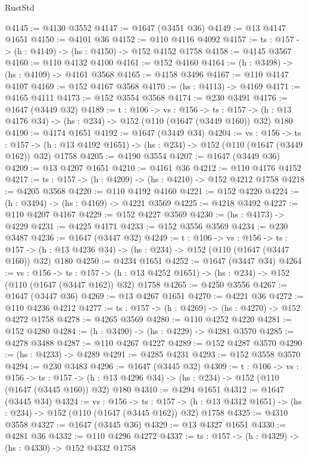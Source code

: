 \begin{lexlean}{RustStd}
\begin{coremodule}
@4145 := @4130 @3552
@4147 := @1647 (@3451 @36)
@4149 := @13 @4147 @1651
@4150 := @4101 @36
@4152 := @110 @4116 @4092
@4157 := {ts : @157} -> (h : @4149) -> (hs : @4150) -> @152 @4152 @1758
@4158 := @4145 @3567
@4160 := @110 @4132 @4100
@4161 := @152 @4160
@4164 := (h : @3498) -> (hs : @4109) -> @4161 @3568
@4165 := @4158 @3496
@4167 := @110 @4147 @4107
@4169 := @152 @4167 @3568
@4170 := (hs : @4113) -> @4169
@4171 := @4165 @4111
@4173 := @152 @3554 @3568
@4174 := @230 @3491
@4176 := @1647 (@3449 @32)
@4189 := {t : @106} ->
  {vs : @156} ->
  {ts : @157} -> (h : @13 @4176 @34) -> (hs : @234) -> @152 (@110 (@1647 (@3449 @160)) @32) @180
@4190 := @4174 @1651
@4192 := @1647 (@3449 @34)
@4204 := {vs : @156} ->
  {ts : @157} -> (h : @13 @4192 @1651) -> (hs : @234) -> @152 (@110 (@1647 (@3449 @162)) @32) @1758
@4205 := @4190 @3554
@4207 := @1647 (@3449 @36)
@4209 := @13 @4207 @1651
@4210 := @4161 @36
@4212 := @110 @4176 @4152
@4217 := {ts : @157} -> (h : @4209) -> (hs : @4210) -> @152 @4212 @1758
@4218 := @4205 @3568
@4220 := @110 @4192 @4160
@4221 := @152 @4220
@4224 := (h : @3494) -> (hs : @4169) -> @4221 @3569
@4225 := @4218 @3492
@4227 := @110 @4207 @4167
@4229 := @152 @4227 @3569
@4230 := (hs : @4173) -> @4229
@4231 := @4225 @4171
@4233 := @152 @3556 @3569
@4234 := @230 @3487
@4236 := @1647 (@3447 @32)
@4249 := {t : @106} ->
  {vs : @156} ->
  {ts : @157} -> (h : @13 @4236 @34) -> (hs : @234) -> @152 (@110 (@1647 (@3447 @160)) @32) @180
@4250 := @4234 @1651
@4252 := @1647 (@3447 @34)
@4264 := {vs : @156} ->
  {ts : @157} -> (h : @13 @4252 @1651) -> (hs : @234) -> @152 (@110 (@1647 (@3447 @162)) @32) @1758
@4265 := @4250 @3556
@4267 := @1647 (@3447 @36)
@4269 := @13 @4267 @1651
@4270 := @4221 @36
@4272 := @110 @4236 @4212
@4277 := {ts : @157} -> (h : @4269) -> (hs : @4270) -> @152 @4272 @1758
@4278 := @4265 @3569
@4280 := @110 @4252 @4220
@4281 := @152 @4280
@4284 := (h : @3490) -> (hs : @4229) -> @4281 @3570
@4285 := @4278 @3488
@4287 := @110 @4267 @4227
@4289 := @152 @4287 @3570
@4290 := (hs : @4233) -> @4289
@4291 := @4285 @4231
@4293 := @152 @3558 @3570
@4294 := @230 @3483
@4296 := @1647 (@3445 @32)
@4309 := {t : @106} ->
  {vs : @156} ->
  {ts : @157} -> (h : @13 @4296 @34) -> (hs : @234) -> @152 (@110 (@1647 (@3445 @160)) @32) @180
@4310 := @4294 @1651
@4312 := @1647 (@3445 @34)
@4324 := {vs : @156} ->
  {ts : @157} -> (h : @13 @4312 @1651) -> (hs : @234) -> @152 (@110 (@1647 (@3445 @162)) @32) @1758
@4325 := @4310 @3558
@4327 := @1647 (@3445 @36)
@4329 := @13 @4327 @1651
@4330 := @4281 @36
@4332 := @110 @4296 @4272
@4337 := {ts : @157} -> (h : @4329) -> (hs : @4330) -> @152 @4332 @1758

\end{coremodule}
\end{lexlean}
